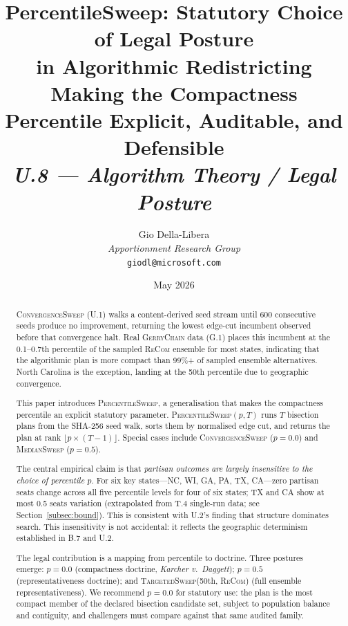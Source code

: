 \documentclass[12pt]{article}
\title{%
  \textbf{PercentileSweep: Statutory Choice of Legal Posture}\\
  \textbf{in Algorithmic Redistricting}\\[0.4em]
  \large Making the Compactness Percentile Explicit, Auditable, and Defensible\\[0.8em]
  \normalsize\textit{U.8 --- Algorithm Theory / Legal Posture}%
}
\author{%
  Gio Della-Libera\\
  \textit{Apportionment Research Group}\\
  \small\texttt{giodl@microsoft.com}
}
\date{May 2026}
\newcommand{\ps}{\textsc{PercentileSweep}}
\newcommand{\cs}{\textsc{ConvergenceSweep}}
\newcommand{\ms}{\textsc{MedianSweep}}
\newcommand{\ts}{\textsc{TargetedSweep}}
\newcommand{\recom}{\textsc{ReCom}}
\newcommand{\gc}{\textsc{GerryChain}}
\newcommand{\case}[1]{\textit{#1}}
\newcommand{\karcher}{\case{Karcher v.\ Daggett}}
\newcommand{\floor}[1]{\lfloor #1 \rfloor}
\begin{document}
\maketitle

\begin{abstract}
\noindent
\cs{} (U.1) walks a content-derived seed stream until 600 consecutive seeds
produce no improvement, returning the lowest edge-cut incumbent observed before
that convergence halt.
Real \gc{} data (G.1) places this incumbent at the 0.1--0.7th percentile of
the sampled \recom{} ensemble for most states, indicating that the algorithmic
plan is more compact than 99\%+ of sampled ensemble alternatives.
North Carolina is the exception, landing at the 50th percentile due to
geographic convergence.

This paper introduces \ps{}, a generalisation that makes the compactness
percentile an explicit statutory parameter.
\ps{}$(p, T)$ runs $T$ bisection plans from the SHA-256 seed walk, sorts them
by normalised edge cut, and returns the plan at rank $\floor{p \times (T-1)}$.
Special cases include \cs{} ($p = 0.0$) and \ms{} ($p = 0.5$).

The central empirical claim is that \emph{partisan outcomes are largely
insensitive to the choice of percentile $p$}.
For six key states---NC, WI, GA, PA, TX, CA---zero partisan seats change
across all five percentile levels for four of six states; TX and CA show
at most 0.5 seats variation (extrapolated from T.4 single-run data;
see Section~\ref{subsec:bound}).
This is consistent with U.2's finding that structure dominates search.
This insensitivity is not accidental: it reflects the geographic determinism
established in B.7 and U.2.

The legal contribution is a mapping from percentile to doctrine.
Three postures emerge: $p = 0.0$ (compactness doctrine, \karcher{});
$p = 0.5$ (representativeness doctrine); and \ts{}(50th, \recom{}) (full
ensemble representativeness).
We recommend $p = 0.0$ for statutory use: the plan is the most compact member
of the declared bisection candidate set, subject to population balance and
contiguity, and challengers must compare against that same audited family.
\end{abstract}

\tableofcontents
\newpage










\end{document}
